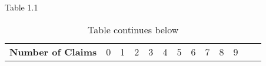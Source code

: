 \documentclass[]{book}
\newenvironment{Shaded}{\begin{snugshade}}{\end{snugshade}}
\newcommand{\KeywordTok}[1]{\textcolor[rgb]{0.13,0.29,0.53}{\textbf{#1}}}
\newcommand{\StringTok}[1]{\textcolor[rgb]{0.31,0.60,0.02}{#1}}
\newcommand{\OperatorTok}[1]{\textcolor[rgb]{0.81,0.36,0.00}{\textbf{#1}}}
\newcommand{\NormalTok}[1]{#1}
\theoremstyle{definition}
\theoremstyle{definition}
\theoremstyle{definition}
\theoremstyle{remark}
\begin{document}
Table 1.1

\begin{Shaded}
\end{Shaded}

\begin{longtable}[]{@{}ccccccccccccc@{}}
\caption{Table continues below}\tabularnewline
\toprule
\begin{minipage}[t]{0.19\columnwidth}\centering\strut
\textbf{Number of Claims}\strut
\end{minipage} & \begin{minipage}[t]{0.05\columnwidth}\centering\strut
0\strut
\end{minipage} & \begin{minipage}[t]{0.05\columnwidth}\centering\strut
1\strut
\end{minipage} & \begin{minipage}[t]{0.04\columnwidth}\centering\strut
2\strut
\end{minipage} & \begin{minipage}[t]{0.04\columnwidth}\centering\strut
3\strut
\end{minipage} & \begin{minipage}[t]{0.04\columnwidth}\centering\strut
4\strut
\end{minipage} & \begin{minipage}[t]{0.04\columnwidth}\centering\strut
5\strut
\end{minipage} & \begin{minipage}[t]{0.03\columnwidth}\centering\strut
6\strut
\end{minipage} & \begin{minipage}[t]{0.03\columnwidth}\centering\strut
7\strut
\end{minipage} & \begin{minipage}[t]{0.03\columnwidth}\centering\strut
8\strut
\end{minipage} & \begin{minipage}[t]{0.03\columnwidth}\centering\strut
9\strut
\end{minipage} & \begin{minipage}[t]{0.04\columnwidth}\centering\strut

\end{minipage}
\end{longtable}
\end{document}
